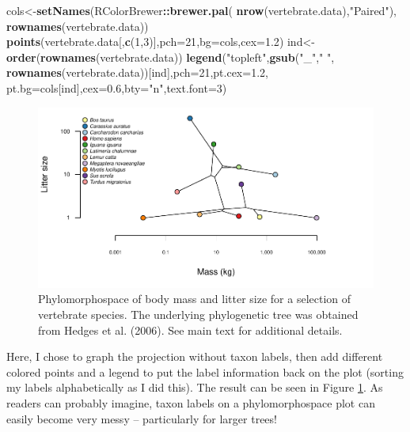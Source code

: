 \documentclass[fleqn,10pt,lineno]{wlpeerj} %
\newenvironment{Shaded}{\begin{snugshade}}{\end{snugshade}}
\newcommand{\AttributeTok}[1]{\textcolor[rgb]{0.13,0.29,0.53}{#1}}
\newcommand{\DecValTok}[1]{\textcolor[rgb]{0.00,0.00,0.81}{#1}}
\newcommand{\FloatTok}[1]{\textcolor[rgb]{0.00,0.00,0.81}{#1}}
\newcommand{\FunctionTok}[1]{\textcolor[rgb]{0.13,0.29,0.53}{\textbf{#1}}}
\newcommand{\NormalTok}[1]{#1}
\newcommand{\OtherTok}[1]{\textcolor[rgb]{0.56,0.35,0.01}{#1}}
\newcommand{\SpecialCharTok}[1]{\textcolor[rgb]{0.81,0.36,0.00}{\textbf{#1}}}
\newcommand{\StringTok}[1]{\textcolor[rgb]{0.31,0.60,0.02}{#1}}
\begin{document}
\begin{Shaded}
\begin{Highlighting}[]
\NormalTok{cols}\OtherTok{\textless{}{-}}\FunctionTok{setNames}\NormalTok{(RColorBrewer}\SpecialCharTok{::}\FunctionTok{brewer.pal}\NormalTok{(}
  \FunctionTok{nrow}\NormalTok{(vertebrate.data),}\StringTok{"Paired"}\NormalTok{),}
  \FunctionTok{rownames}\NormalTok{(vertebrate.data))}
\FunctionTok{points}\NormalTok{(vertebrate.data[,}\FunctionTok{c}\NormalTok{(}\DecValTok{1}\NormalTok{,}\DecValTok{3}\NormalTok{)],}\AttributeTok{pch=}\DecValTok{21}\NormalTok{,}\AttributeTok{bg=}\NormalTok{cols,}\AttributeTok{cex=}\FloatTok{1.2}\NormalTok{)}
\NormalTok{ind}\OtherTok{\textless{}{-}}\FunctionTok{order}\NormalTok{(}\FunctionTok{rownames}\NormalTok{(vertebrate.data))}
\FunctionTok{legend}\NormalTok{(}\StringTok{"topleft"}\NormalTok{,}\FunctionTok{gsub}\NormalTok{(}\StringTok{"\_"}\NormalTok{,}\StringTok{" "}\NormalTok{,}
  \FunctionTok{rownames}\NormalTok{(vertebrate.data))[ind],}\AttributeTok{pch=}\DecValTok{21}\NormalTok{,}\AttributeTok{pt.cex=}\FloatTok{1.2}\NormalTok{,}
  \AttributeTok{pt.bg=}\NormalTok{cols[ind],}\AttributeTok{cex=}\FloatTok{0.6}\NormalTok{,}\AttributeTok{bty=}\StringTok{"n"}\NormalTok{,}\AttributeTok{text.font=}\DecValTok{3}\NormalTok{)}
\end{Highlighting}
\end{Shaded}

\begin{figure}
\includegraphics[width=1\linewidth]{Revell.phytools-v2_peerj_files/figure-latex/fig21-vert-phylomorphospace-1} \caption{Phylomorphospace of body mass and litter size for a selection of vertebrate species. The underlying phylogenetic tree was obtained from Hedges et al. (2006). See main text for additional details.}\label{fig:fig21-vert-phylomorphospace}
\end{figure}

Here, I chose to graph the projection without taxon labels, then add different colored points and a legend to put the label information back on the plot (sorting my labels alphabetically as I did this). The result can be seen in Figure \ref{fig:fig21-vert-phylomorphospace}. As readers can probably imagine, taxon labels on a phylomorphospace plot can easily become very messy -- particularly for larger trees!
\end{document}
